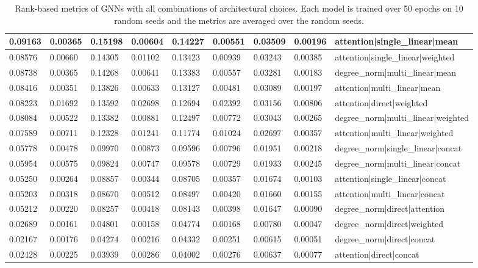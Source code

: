 \documentclass{article}
\begin{document}
\begin{table}
\begin{tabular}{lllllllll}
0.09163 & 0.00365     & 0.15198 & 0.00604   & 0.14227   & 0.00551        & 0.03509 & 0.00196  & attention|single\_linear|mean         \\ \hline
0.08576 & 0.00660     & 0.14305 & 0.01102   & 0.13423   & 0.00939        & 0.03243 & 0.00385  & attention|single\_linear|weighted     \\ \hline
0.08738 & 0.00365     & 0.14268 & 0.00641   & 0.13383   & 0.00557        & 0.03281 & 0.00183  & degree\_norm|multi\_linear|mean       \\ \hline
0.08416 & 0.00351     & 0.13826 & 0.00633   & 0.13127   & 0.00481        & 0.03089 & 0.00197  & attention|multi\_linear|mean          \\ \hline
0.08223 & 0.01692     & 0.13592 & 0.02698   & 0.12694   & 0.02392        & 0.03156 & 0.00806  & attention|direct|weighted             \\ \hline
0.08084 & 0.00522     & 0.13382 & 0.00881   & 0.12497   & 0.00772        & 0.03043 & 0.00265  & degree\_norm|multi\_linear|weighted   \\ \hline
0.07589 & 0.00711     & 0.12328 & 0.01241   & 0.11774   & 0.01024        & 0.02697 & 0.00357  & attention|multi\_linear|weighted      \\ \hline
0.05778 & 0.00478     & 0.09970 & 0.00873   & 0.09596   & 0.00796        & 0.01951 & 0.00218  & degree\_norm|single\_linear|concat    \\ \hline
0.05954 & 0.00575     & 0.09824 & 0.00747   & 0.09578   & 0.00729        & 0.01933 & 0.00245  & degree\_norm|multi\_linear|concat     \\ \hline
0.05250 & 0.00264     & 0.08857 & 0.00344   & 0.08705   & 0.00357        & 0.01674 & 0.00103  & attention|single\_linear|concat       \\ \hline
0.05203 & 0.00318     & 0.08670 & 0.00512   & 0.08497   & 0.00420        & 0.01660 & 0.00155  & attention|multi\_linear|concat        \\ \hline
0.05212 & 0.00220     & 0.08257 & 0.00418   & 0.08143   & 0.00398        & 0.01647 & 0.00090  & degree\_norm|direct|attention         \\ \hline
0.02689 & 0.00161     & 0.04801 & 0.00158   & 0.04774   & 0.00168        & 0.00780 & 0.00047  & degree\_norm|direct|weighted          \\ \hline
0.02167 & 0.00176     & 0.04274 & 0.00216   & 0.04332   & 0.00251        & 0.00615 & 0.00051  & degree\_norm|direct|concat            \\ \hline
0.02428 & 0.00225     & 0.03939 & 0.00286   & 0.04002   & 0.00276        & 0.00637 & 0.00077  & attention|direct|concat               \\ \hline
\end{tabular}
\caption{Rank-based metrics of GNNs with all combinations of architectural choices. Each model is trained over 50 epochs on 10 random seeds and the metrics are averaged over the random seeds.}
\label{tab:full-metrics}
\end{table}
\end{document}
